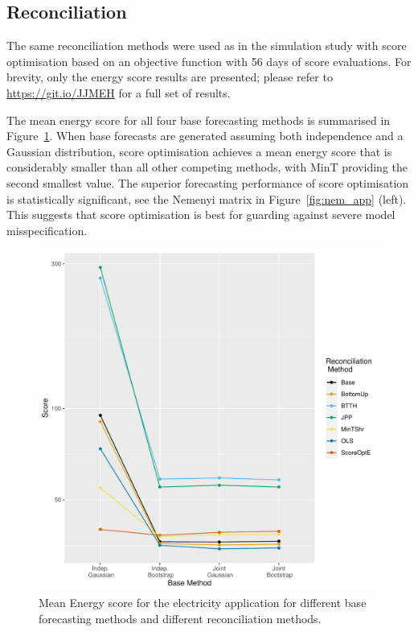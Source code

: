 \documentclass[a4paper,12pt]{article}
\theoremstyle{definition}
\begin{document}
\subsection{Reconciliation}\label{sec:applreco}

The same reconciliation methods were used as in the simulation study with score optimisation based on an objective function with 56 days of score evaluations. For brevity, only the energy score results are presented; please refer to \url{https://git.io/JJMEH} for a full set of results.

The mean energy score for all four base forecasting methods is summarised in Figure~\ref{fig:meanenergy_app}. When base forecasts are generated assuming both independence and a Gaussian distribution, score optimisation achieves a mean energy score that is considerably smaller than all other competing methods, with MinT providing the second smallest value. The superior forecasting performance of score optimisation is statistically significant, see the Nemenyi matrix in Figure~\ref{fig:nem_app} (left). This suggests that score optimisation is best for guarding against severe model misspecification.

\begin{figure}[!htb]
  \centering
  \includegraphics[width=.35\textheight]{meanenergyscore}
  \caption{Mean Energy score for the electricity application for different base forecasting methods and different reconciliation methods.}\label{fig:meanenergy_app}
\end{figure}
\end{document}
